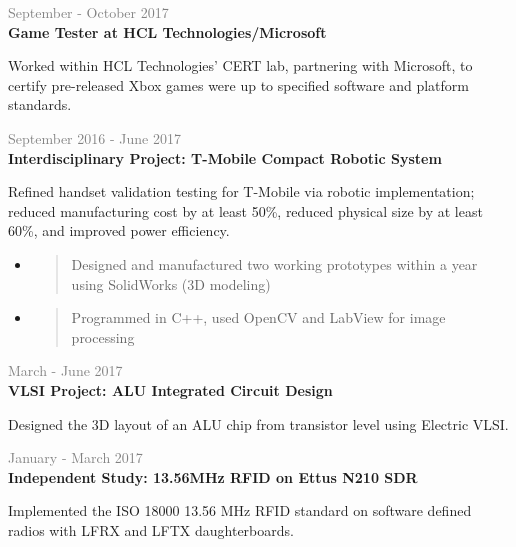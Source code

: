 \documentclass[letterpage]{article}
\begin{document}
\begin{minipage}[t]{0.63\linewidth}
\vspace{7px}
\textcolor{gray}{September - October 2017}\\
\textbf{\textsf{Game Tester at HCL Technologies/Microsoft}}\\
\raggedright
Worked within HCL Technologies' CERT lab, partnering with
Microsoft, to certify pre-released Xbox games were
up to specified software and platform standards.

\vspace{7px}
\textcolor{gray}{September 2016 - June 2017}
\textcolor{light-sky-blue}{}
\\
\textbf{\textsf{Interdisciplinary Project:
		T-Mobile Compact Robotic System}}\\
\raggedright
Refined handset validation testing for T-Mobile via robotic
implementation;\\reduced manufacturing cost by at least 50\%,
reduced physical size by at least 60\%, and improved
power efficiency.\\
\begin{itemize}[leftmargin=*,labelindent=1mm,labelsep=0mm]
\item
  \begin{quote}
  \raggedright
  Designed and manufactured two working prototypes within
  a year using SolidWorks (3D modeling)
  \end{quote}
\item
  \begin{quote}
  \raggedright
  Programmed in C++,
  used OpenCV and LabView for image processing
  \end{quote}
\end{itemize}

\vspace{7px}
\textcolor{gray}{March - June 2017}\\
\textbf{\textsf{VLSI Project: ALU Integrated Circuit Design}}\\
\raggedright
Designed the 3D layout of an ALU chip from transistor level
using Electric VLSI.

\vspace{7px}
\textcolor{gray}{January - March 2017}\\
\textbf{\textsf{Independent Study: 13.56MHz RFID on Ettus N210 SDR}}\\
\raggedright
Implemented the ISO 18000 13.56 MHz RFID standard on software defined
radios with LFRX and LFTX daughterboards.


\end{minipage}
\end{document}
